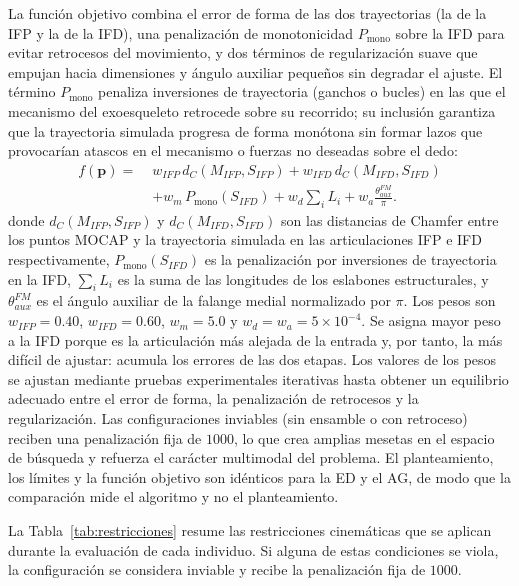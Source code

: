 \documentclass[conference]{IEEEtran}
\begin{document}
La función objetivo combina el error de forma de las dos trayectorias (la de la
IFP y la de la IFD), una penalización de monotonicidad $P_{\text{mono}}$ sobre
la IFD para evitar retrocesos del movimiento, y dos términos de regularización
suave que empujan hacia dimensiones y ángulo auxiliar pequeños sin degradar el
ajuste. El término $P_{\text{mono}}$ penaliza inversiones de trayectoria
(ganchos o bucles) en las que el mecanismo del exoesqueleto retrocede sobre su
recorrido; su inclusión garantiza que la trayectoria simulada progresa de forma
monótona sin formar lazos que provocarían atascos en el mecanismo o fuerzas no
deseadas sobre el dedo:
\begin{align}
f(\mathbf{p}) =\;& w_{IFP}\,d_C(M_{IFP},S_{IFP}) + w_{IFD}\,d_C(M_{IFD},S_{IFD}) \nonumber\\
& + w_{m}\,P_{\text{mono}}(S_{IFD}) + w_{d}\!\sum_{i}\!L_i + w_{a}\frac{\theta_{aux}^{FM}}{\pi}.
\label{eq:obj}
\end{align}
donde $d_C(M_{IFP},S_{IFP})$ y $d_C(M_{IFD},S_{IFD})$ son las distancias de
Chamfer entre los puntos MOCAP y la trayectoria simulada en las articulaciones
IFP e IFD respectivamente, $P_{\text{mono}}(S_{IFD})$ es la penalización por
inversiones de trayectoria en la IFD, $\sum_{i} L_i$ es la suma de las longitudes
de los eslabones estructurales, y $\theta_{aux}^{FM}$ es el ángulo auxiliar de la
falange medial normalizado por $\pi$.
Los pesos son $w_{IFP}=0.40$, $w_{IFD}=0.60$, $w_{m}=5.0$ y
$w_{d}=w_{a}=5\times10^{-4}$. Se asigna mayor peso a la IFD porque es la
articulación más alejada de la entrada y, por tanto, la más difícil de ajustar:
acumula los errores de las dos etapas. Los valores de los pesos se ajustan
mediante pruebas experimentales iterativas hasta obtener un equilibrio adecuado
entre el error de forma, la penalización de retrocesos y la regularización. Las
configuraciones inviables (sin ensamble o con retroceso) reciben una
penalización fija de $1000$, lo que crea amplias mesetas en el espacio de
búsqueda y refuerza el carácter multimodal del problema. El
planteamiento, los límites y la función objetivo son idénticos para la ED y el
AG, de modo que la comparación mide el algoritmo y no el planteamiento.

La Tabla~\ref{tab:restricciones} resume las restricciones cinemáticas que se
aplican durante la evaluación de cada individuo. Si alguna de estas condiciones
se viola, la configuración se considera inviable y recibe la penalización fija
de $1000$.
\end{document}

